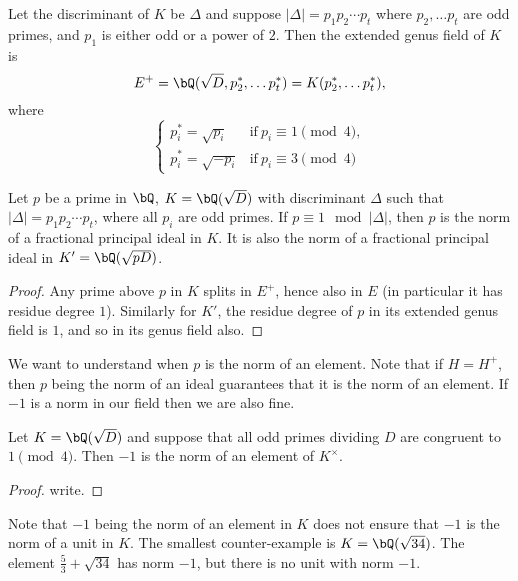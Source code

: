 \begin{thm} 
Let the discriminant of $K$ be $\Delta$ and suppose $|\Delta| = p_1 p_2 \cdots p_t$ where $p_2, \ldots p_t$ are odd primes, and $p_1$ is either odd or a power of $2$. Then the extended genus field of $K$ is 
    \[ E^{+} = \bQ(\sqrt{D}, p_2^*, \ldots p_t^*) = K(p_2^*, \ldots p_t^*), \] 
where 
\[ \begin{cases}
    p_i^* = \sqrt{p_i} & \mathrm{if }\ p_i \equiv 1 \pmod 4, \\
    p_i^* = \sqrt{-p_i} & \mathrm{if }\ p_i \equiv 3 \pmod 4
\end{cases}\]
\end{thm} 

\begin{cor}\label{p-one-mod-disc}
    Let $p$ be a prime in $\bQ$, $K = \bQ(\sqrt{D})$ with discriminant $\Delta$ such that $|\Delta| = p_1 p_2 \cdots p_t$, where all $p_i$ are odd primes. If $p \equiv 1 \mod {|\Delta|}$, then $p$ is the norm of a fractional principal ideal in $K$. It is also the norm of a fractional principal ideal in $K' = \bQ({\sqrt{pD}})$.
\end{cor}

\begin{proof}
    Any prime above $p$ in $K$ splits in $E^{+}$, hence also in $E$ (in particular it has residue degree $1$). Similarly for $K'$, the residue degree of $p$ in its extended genus field is $1$, and so in its genus field also.
\end{proof}

We want to understand when $p$ is the norm of an element. Note that if $H = H^{+}$, then $p$ being the norm of an ideal guarantees that it is the norm of an element. If $-1$ is a norm in our field then we are also fine. 

\begin{thm}\label{minus-one-norm}
Let $K = \bQ(\sqrt{D})$ and suppose that all odd primes dividing $D$ are congruent to $1 \pmod 4$. Then $-1$ is the norm of an element of $K^{\times}$. 
\end{thm}

\begin{proof}
{\color{red} write.}
\end{proof}

Note that $-1$ being the norm of an element in $K$ does not ensure that $-1$ is the norm of a unit in $K$. The smallest counter-example is $K = \bQ(\sqrt{34})$. The element $\frac{5}{3} + \sqrt{34}$ has norm $-1$, but there is no unit with norm $-1$. 

